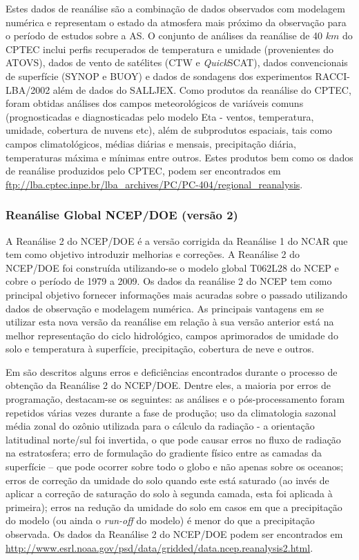 Estes dados de reanálise são a combinação de dados observados com modelagem numérica e representam o estado da atmosfera mais próximo da observação para o período de estudos sobre a AS. O conjunto de análises da reanálise de 40 $km$ do CPTEC inclui perfis recuperados de temperatura e umidade (provenientes do ATOVS), dados de vento de satélites (CTW e \textit{Quick}SCAT), dados convencionais de superfície (SYNOP e BUOY) e dados de sondagens dos experimentos RACCI-LBA/2002 \cite{silvadiasetal03} além de dados do SALLJEX. Como produtos da reanálise do CPTEC, foram obtidas análises dos campos meteorológicos de variáveis comuns (prognosticadas e diagnosticadas pelo modelo Eta - ventos, temperatura, umidade, cobertura de nuvens etc), além de subprodutos espaciais, tais como campos climatológicos, médias diárias e mensais, precipitação diária, temperaturas máxima e mínimas entre outros. Estes produtos bem como os dados de reanálise produzidos pelo CPTEC, podem ser encontrados em \url{ftp://lba.cptec.inpe.br/lba_archives/PC/PC-404/regional_reanalysis}.

\subsubsection{Reanálise Global NCEP/DOE (versão 2)}

A Reanálise 2 do NCEP/DOE \cite{kanamitsuetal02} é a versão corrigida da Reanálise 1 do NCAR \cite{kalnayetal96} que tem como objetivo introduzir melhorias e correções. A Reanálise 2 do NCEP/DOE foi construída utilizando-se o modelo global T062L28 do NCEP e cobre o período de 1979 a 2009. Os dados da reanálise 2 do NCEP tem como principal objetivo fornecer informações mais acuradas sobre o passado utilizando dados de observação e modelagem numérica. As principais vantagens em se utilizar esta nova versão da reanálise em relação à sua versão anterior está na melhor representação do ciclo hidrológico, campos aprimorados de umidade do solo e temperatura à superfície, precipitação, cobertura de neve e outros.

Em  são descritos alguns erros e deficiências encontrados durante o processo de obtenção da Reanálise 2 do NCEP/DOE. Dentre eles, a maioria por erros de programação, destacam-se os seguintes: as análises e o pós-processamento foram repetidos várias vezes durante a fase de produção; uso da climatologia sazonal média zonal do ozônio utilizada para o cálculo da radiação - a orientação latitudinal norte/sul foi invertida, o que pode causar erros no fluxo de radiação na estratosfera; erro de formulação do gradiente físico entre as camadas da superfície – que pode ocorrer sobre todo o globo e não apenas sobre os oceanos; erros de correção da umidade do solo quando este está saturado (ao invés de aplicar a correção de saturação do solo à segunda camada, esta foi aplicada à primeira); erros na redução da umidade do solo em casos em que a precipitação do modelo (ou ainda o \textit{run-off} do modelo) é menor do que a precipitação observada. Os dados da Reanálise 2 do NCEP/DOE podem ser encontrados em \url{http://www.esrl.noaa.gov/psd/data/gridded/data.ncep.reanalysis2.html}.

